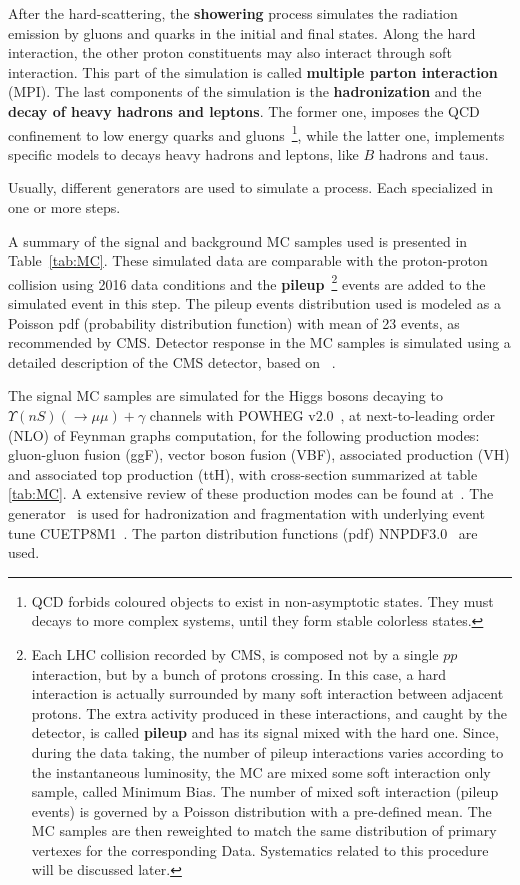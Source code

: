 After the hard-scattering, the \textbf{showering} process simulates the radiation emission by gluons and quarks in the initial and final states. Along the hard interaction, the other proton constituents may also interact through soft interaction. This part of the simulation is called \textbf{multiple parton interaction} (MPI). The last components of the simulation is the \textbf{hadronization} and the \textbf{decay of heavy hadrons and leptons}. The former one, imposes the QCD confinement to low energy quarks and gluons~\footnote{QCD forbids coloured objects to exist in non-asymptotic states. They must decays to more complex systems, until they form stable colorless states.}, while the latter one, implements specific models to decays heavy hadrons and leptons, like $B$ hadrons and taus.

Usually, different generators are used to simulate a process. Each specialized in one or more steps.

A summary of the signal and background MC samples used is presented in Table~\ref{tab:MC}. These simulated data are comparable with the proton-proton collision using 2016 data conditions and the \textbf{pileup}~\footnote{Each LHC collision recorded by CMS, is composed not by a single $pp$ interaction, but by a bunch of protons crossing. In this case, a hard interaction is actually surrounded by many soft interaction between adjacent protons. The extra activity produced in these interactions, and caught by the detector, is called \textbf{pileup} and has its signal mixed with the hard one. Since, during the data taking, the number of pileup interactions varies according to the instantaneous luminosity, the MC are mixed some soft interaction only sample, called Minimum Bias. The number of mixed soft interaction (pileup events) is governed by a Poisson distribution with a pre-defined mean. The MC samples are then reweighted to match the same distribution of primary vertexes for the corresponding Data. Systematics related to this procedure will be discussed later.} events are added to the simulated event in this step. The pileup events distribution used is modeled as a Poisson pdf (probability distribution function) with mean of 23 events, as recommended by CMS. Detector response in the MC samples is simulated using a detailed description of the CMS detector, based on \GEANTfour~\cite{Agostinelli:2002hh}.

The signal MC samples are simulated for the Higgs bosons decaying to $\Upsilon(nS) (\rightarrow \mu\mu) + \gamma$  channels with POWHEG v2.0~\cite{powheg2_1,powheg2_2,powheg2_3}, at next-to-leading order (NLO) of Feynman graphs computation, for the following production modes: gluon-gluon fusion (ggF), vector boson fusion (VBF), associated production (VH) and associated top production (ttH), with cross-section summarized at table \ref{tab:MC}. A extensive review of these production modes can be found at~\cite{DJOUADI20081}. The  generator~\cite{SJOSTRAND2008852,Sjostrand:2014zea} is used for hadronization and fragmentation with underlying event tune CUETP8M1~\cite{Khachatryan:2015pea}. The parton distribution functions (pdf) NNPDF3.0~\cite{NNPDF3} are used. 

